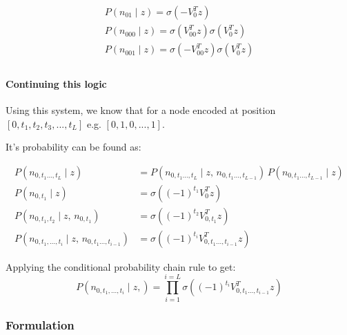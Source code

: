 \documentclass[parskip]{komatufte}
\begin{document}
\begin{align}
P(n_{01}\mid z)=\sigma(-V_{0}^{T}z) \\
P(n_{000}\mid z)=\sigma(V_{00}^{T}z)\sigma(V_{0}^{T}z) \\
P(n_{001}\mid z)=\sigma(-V_{00}^{T}z)\sigma(V_{0}^{T}z) \\
\end{align}

\paragraph{Continuing this logic}

Using this system,
we know that for a node encoded at position $[0,t_{1},t_{2},t_{3},...,t_{L}]$
e.g. $[0,1,0,...,1]$.

It's probability can be found as: 

\begin{align}
P(n_{0,t_{1}...,t_{L}}\mid z) &= P(n_{0,t_{1}...,t_{L}}\mid z,\,n_{0,t_{1}...,t_{L-1}})\,P(n_{0,t_{1}...,t_{L-1}}\mid z)\\
%
P(n_{0,t_{1}}\mid z)&=\sigma\left((-1)^{t_{1}}V_{0}^{T}z\right)\\
%
P(n_{0,t_{1},t_{2}}\mid z,\,n_{0,t_{1}})&=\sigma\left((-1)^{t_{2}}V_{0,t_{1}}^{T}z\right)\\
%
P(n_{0,t_{1},...,t_{i}}\mid z,\,n_{0,t_{1}...,t_{i-1}})&=\sigma\left((-1)^{t_{i}}V_{0,t_{1}...,t_{i-1}}^{T}z\right)
\end{align}

Applying the conditional probability chain rule to get:
\begin{equation}
P(n_{0,t_{1},...,t_{i}}\mid z,)=\prod_{i=1}^{i=L}\sigma\left((-1)^{t_{i}}V_{0,t_{1}...,t_{i-1}}^{T}z\right)
\end{equation}

\subsubsection{Formulation}
\end{document}
